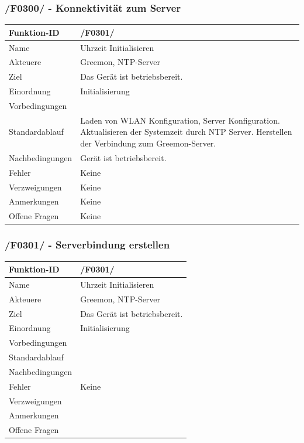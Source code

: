 \documentclass[pointlessnumbers]{scrartcl}
\begin{document}
 \subsubsection{/F0300/ - Konnektivität zum Server}
 \begin{tabular}{|p{\BreiteErsterTab}|p{\BreiteZweiterTab}|}\hline
   Funktion-ID & /F0301/  \\ \hline
   Name & Uhrzeit Initialisieren\\ \hline
   Akteuere & Greemon, NTP-Server\\ \hline
   Ziel & Das Gerät ist betriebsbereit. \\ \hline
    Einordnung & Initialisierung \\ \hline
    Vorbedingungen &  \\ \hline
    Standardablauf & Laden von WLAN Konfiguration, Server Konfiguration. Aktualisieren der Systemzeit durch NTP Server. Herstellen der Verbindung zum Greemon-Server.\\ \hline
    Nachbedingungen & Gerät ist betriebsbereit. \\ \hline
    Fehler & Keine \\ \hline
    Verzweigungen & Keine \\ \hline
    Anmerkungen & Keine \\ \hline
    Offene Fragen & Keine\\ \hline
 \end{tabular} 

 \subsubsection{/F0301/ - Serverbindung erstellen}
 \begin{tabular}{|p{\BreiteErsterTab}|p{\BreiteZweiterTab}|}\hline
   Funktion-ID & /F0301/  \\ \hline
   Name & Uhrzeit Initialisieren\\ \hline
   Akteuere & Greemon, NTP-Server\\ \hline
   Ziel & Das Gerät ist betriebsbereit. \\ \hline
    Einordnung & Initialisierung \\ \hline
    Vorbedingungen &  \\ \hline
    Standardablauf & \\ \hline
    Nachbedingungen &  \\ \hline
    Fehler & Keine \\ \hline
    Verzweigungen &  \\ \hline
    Anmerkungen &  \\ \hline
    Offene Fragen & \\ \hline
 \end{tabular} 
 
\end{document}
